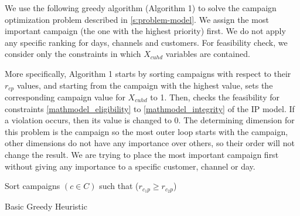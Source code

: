 \documentclass[11pt]{article}
\begin{document}
We use the following greedy algorithm (Algorithm 1) to solve the campaign optimization problem described in \ref{s:problem-model}. We assign  the most important campaign (the one with the highest priority) first. We do not apply any specific ranking for days, channels and customers. For feasibility check, we consider only the constraints in which $X_{{c}{u}{h}{d}}$ variables are contained.

More specifically, Algorithm 1 starts by sorting campaigns with respect to their $r_{cp}$ values, and starting from the campaign with the highest value, sets the corresponding campaign value for $X_{cuhd}$ to 1. Then, checks the feasibility for constraints \eqref{mathmodel_eligibility} to \eqref{mathmodel_integrity} of the IP model. If a violation occurs, then its value is changed to 0. The determining dimension for this problem is the campaign so the most outer loop starts with the campaign, other dimensions do not have any importance over others, so their order will not change the result. We are trying to place the most important campaign first without giving any importance to a specific customer, channel or day.

\begin{singlespace}

\begin{algorithm}[H]
\DontPrintSemicolon
{}

Sort campaigns $(c \in C)$ such that ($r_{c_{1}p} \geq r_{c_{2}p}$)\\
\;
\caption{Basic Greedy Heuristic}
\label{algo:greedy_impl1}
\end{algorithm}
\end{singlespace}
\end{document}
